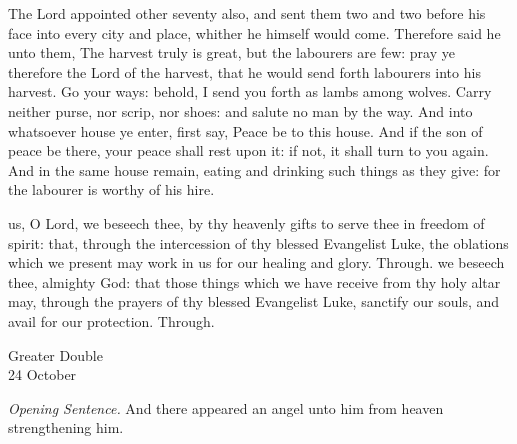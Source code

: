 
 The Lord appointed other seventy also, and sent them two and two before his face into every city and place, whither he himself would come. Therefore said he unto them, The harvest truly is great, but the labourers are few: pray ye therefore the Lord of the harvest, that he would send forth labourers into his harvest. Go your ways: behold, I send you forth as lambs among wolves. Carry neither purse, nor scrip, nor shoes: and salute no man by the way. And into whatsoever house ye enter, first say, Peace be to this house. And if the son of peace be there, your peace shall rest upon it: if not, it shall turn to you again. And in the same house remain, eating and drinking such things as they give: for the labourer is worthy of his hire.

\secret
{} us, O Lord, we beseech thee, by thy heavenly gifts to serve thee in freedom of spirit: that, through the intercession of thy blessed Evangelist Luke, the oblations which we present may work in us for our healing and glory. Through.
\postcommunion
{} we beseech thee, almighty God: that those things which we have receive from thy holy altar may, through the prayers of thy blessed Evangelist Luke, sanctify our souls, and avail for our protection. Through.

\begin{inhead}
	{Greater Double\\
		24 October}
\end{inhead}
\par\noindent
\textit{Opening Sentence.} And there appeared an angel unto him from heaven strengthening him.
\par\noindent
{}
\par\noindent
{}

